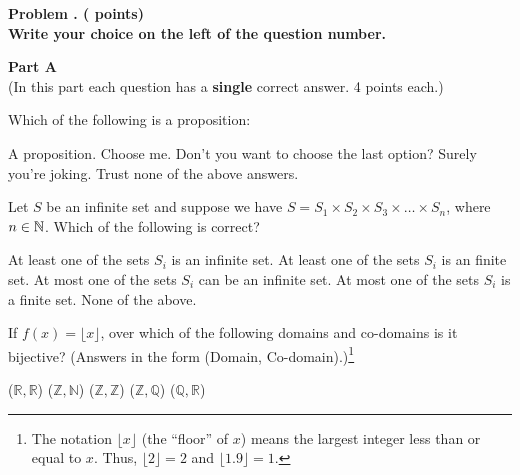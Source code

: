 
\newpage

\addtocounter{problemctr}{1}

{\bf
Problem \theproblemctr.  (\thechoices\xspace points)}
\\

{\bf Write your choice on the left of the question number.}


\begin{center}
{\bf Part A}\\
\medskip
(In this part each question has a {\bf single} correct answer. 4 points each.)
\end{center}
\bigskip

\begin{questions}

\question Which of the following is a proposition:	
\begin{choices}
\choice A proposition.
\choice Choose me.
\choice Don't you want to choose the last option?
\choice Surely you're joking.
\choice Trust none of the above answers.
\end{choices}


\vspace{1.8in}

\question Let $S$ be an infinite set and suppose we have $S=S_1\times S_2 \times S_3\times \dots \times S_n$, where $n\in {\mathbb N}{}$. Which of the following is correct?
\begin{choices}
\choice At least one of the sets $S_i$ is an infinite set.
\choice At least one of the sets $S_i$ is an finite set.
\choice At most one of the sets $S_i$ can be an infinite set.
\choice At most one of the sets $S_i$ is a finite set.
\choice None of the above.
\end{choices}

\newpage

\question If $f(x) = \lfloor x \rfloor$, over which of the following
domains and co-domains is it bijective? (Answers in the form (Domain,
Co-domain).)\footnote{The notation $\lfloor x\rfloor$ (the ``floor''
  of $x$) means the largest integer less than or equal to $x$.  Thus,
  $\lfloor 2\rfloor=2$ and $\lfloor 1.9\rfloor=1$.}
\begin{choices}
\choice ($\mathbb{R}, \mathbb{R}$) 
\choice ($\mathbb{Z}, \mathbb{N}$) 
\choice ($\mathbb{Z}, \mathbb{Z}$) 
\choice ($\mathbb{Z}, \mathbb{Q}$) 
\choice ($\mathbb{Q}, \mathbb{R}$) 
\end{choices}


\end{questions}
